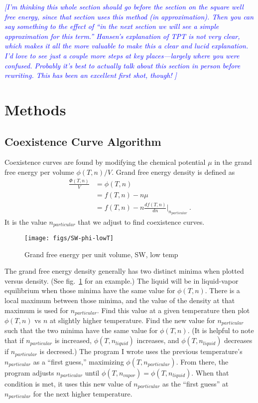 \documentclass[letterpaper,twocolumn,amsmath,amssymb,prb]{revtex4-1}
\newcommand{\npart}{\ensuremath{n_{particular}}}
\newcommand{\nliq}{\ensuremath{n_{liquid}}}
\newcommand{\nvap}{\ensuremath{n_{vapor}}}
\newcommand{\1}{\ensuremath{\textbf{r}_1}}
\newcommand{\2}{\ensuremath{\textbf{r}_2}}
\newcommand{\3}{\ensuremath{\textbf{r}_3}}
\newcommand{\4}{\ensuremath{\textbf{r}_4}}
\newcommand{\davidsays}[1]{\textcolor{blue}{\textit{[#1]}}}
\begin{document}
\davidsays{I'm thinking this whole section should go \emph{before} the
  section on the square well free energy, since that section uses this
  method (in approximation).  Then you can say something to the effect
  of ``in the next section we will see a simple approximation for this
  term.''  Hansen's explanation of TPT is not very clear, which makes
  it all the more valuable to make \emph{this} a clear and lucid
  explanation.  I'd love to see just a couple more steps at key
  places---largely where you were confused.  Probably it's best to
  actually talk about this section in person before rewriting.  This
  has been an excellent first shot, though! }

\section{Methods}\label{sec:methods}

\subsection{Coexistence Curve Algorithm}\label{subsec:coexis}
Coexistence curves are found by modifying the chemical potential $\mu$
in the grand free energy per volume $\phi(T,n)/V$. Grand free energy
density is defined as
\begin{align}
  \frac{\Phi(T,n)}{V} &= \phi(T,n) \nonumber \\
                 &= f(T,n) - n\mu \nonumber \\
                 &= f(T,n) - n\frac{df(T,n)}{dn}\bigg|_{\npart}\ .
\end{align}
It is the value $\npart$ that we adjust to find coexistence curves.

\begin{figure}
  \centering
  \texttt{[image: figs/SW-phi-lowT]}
  \caption{Grand free energy per unit volume, SW, low temp}
  \label{fig:SW-phi-lowT}
\end{figure}

The grand free energy density generally has two distinct minima when
plotted versus density. (See fig.~\ref{fig:SW-phi-lowT} for an example.) The liquid will be in liquid-vapor equilibrium
when those minima have the same value for $\phi(T,n)$. There is a local
maximum between those minima, and the value of the density at that
maximum is used for $\npart$. Find this value at a given temperature
then plot $\phi(T,n)$ vs $n$ at slightly higher temperature. Find the new
value for $\npart$ such that the two minima have the same value for
$\phi(T,n)$. (It is helpful to note that if $\npart$ is increased,
$\phi(T,\nliq)$ increases, and $\phi(T,\nliq)$ decreases if $\npart$ is
decresed.) The program I wrote uses the previous
temperature's $\npart$ as a ``first guess,'' maximizing
$\phi(T,\npart)$. From there, the program adjusts $\npart$
until $\phi(T,\nvap) = \phi(T,\nliq)$. When that condition is met, it
uses this new value of $\npart$ as the ``first guess'' at $\npart$ for the next
higher temperature.
\end{document}
